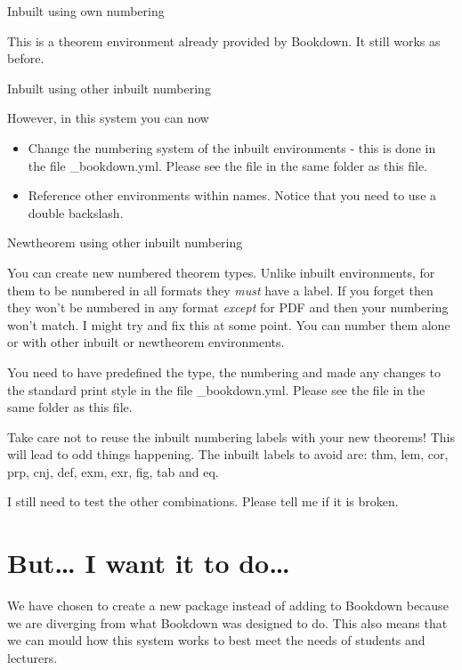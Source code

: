 \documentclass[
  12pt,
  a4paper]{extarticle}
\providecommand{\tightlist}{%
  \setlength{\itemsep}{0pt}\setlength{\parskip}{0pt}}
\theoremstyle{plain}
\theoremstyle{definition}
\theoremstyle{plain}
\theoremstyle{plain}
\theoremstyle{plain}
\theoremstyle{plain}
\theoremstyle{definition}
\theoremstyle{definition}
\theoremstyle{remark}
\theoremstyle{remark}
\let\BeginKnitrBlock\begin \let\EndKnitrBlock\end
\renewcommand{\;}{\,}
\begin{document}
Inbuilt using own numbering
\begingroup\renewcommand{\thetheorem}{\ref{thm:thm1}}
\BeginKnitrBlock{theorem}[Foo]
{ }
This is a theorem environment already provided by Bookdown. It still works as before.
\EndKnitrBlock{theorem}
\endgroup\addtocounter{theorem}{-1}
Inbuilt using other inbuilt numbering
\begingroup\renewcommand{\thetheorem}{\ref{prp:prp1}}
\BeginKnitrBlock{proposition}[Thingy we need for \ref{thm:thm1}]
{ }
However, in this system you can now

\begin{itemize}
\tightlist
\item
  Change the numbering system of the inbuilt environments - this is done in the file \_bookdown.yml. Please see the file in the same folder as this file.
\item
  Reference other environments within names. Notice that you need to use a double backslash.
\end{itemize}
\EndKnitrBlock{proposition}
\endgroup\addtocounter{theorem}{-1}
Newtheorem using other inbuilt numbering
\begingroup\renewcommand{\thedefinition}{\ref{Def:def1}}
\BeginKnitrBlock{Definitions}
{}
You can create new numbered theorem types. Unlike inbuilt environments, for them to be numbered in all formats they \emph{must} have a label. If you forget then they won't be numbered in any format \emph{except} for PDF and then your numbering won't match. I might try and fix this at some point. You can number them alone or with other inbuilt or newtheorem environments.

You need to have predefined the type, the numbering and made any changes to the standard print style in the file \_bookdown.yml. Please see the file in the same folder as this file.

Take care not to reuse the inbuilt numbering labels with your new theorems! This will lead to odd things happening. The inbuilt labels to avoid are: thm, lem, cor, prp, cnj, def, exm, exr, fig, tab and eq.
\EndKnitrBlock{Definitions}
\endgroup\addtocounter{definition}{-1}
I still need to test the other combinations. Please tell me if it is broken.

\hypertarget{but-i-want-it-to-do}{%
\section{But\ldots{} I want it to do\ldots{}}\label{but-i-want-it-to-do}}

We have chosen to create a new package instead of adding to Bookdown because we are diverging from what Bookdown was designed to do. This also means that we can mould how this system works to best meet the needs of students and lecturers.
\end{document}
